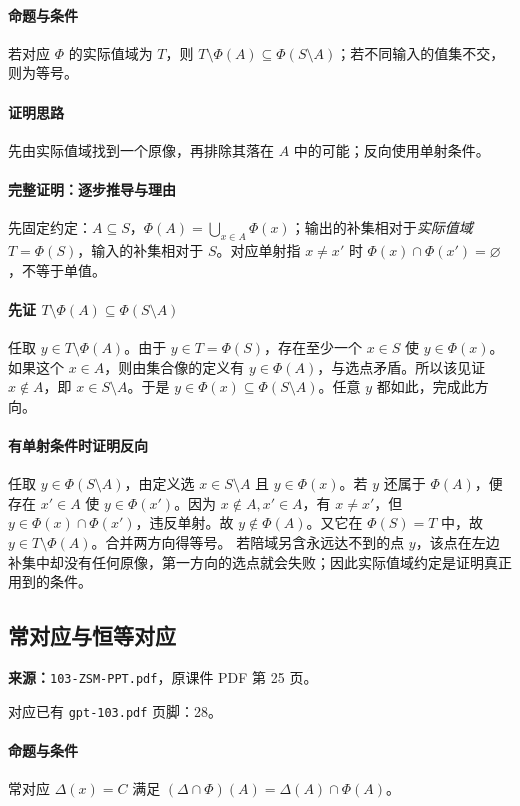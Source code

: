 \paragraph{命题与条件}若对应 $\Phi$ 的实际值域为 $T$，则 $T\setminus\Phi(A)\subseteq\Phi(S\setminus A)$；若不同输入的值集不交，则为等号。
\paragraph{证明思路}先由实际值域找到一个原像，再排除其落在 $A$ 中的可能；反向使用单射条件。
\paragraph{完整证明：逐步推导与理由}

先固定约定：$A\subseteq S$，$\Phi(A)=\bigcup_{x\in A}\Phi(x)$；输出的补集相对于\emph{实际值域} $T=\Phi(S)$，输入的补集相对于 $S$。对应单射指 $x\ne x'$ 时 $\Phi(x)\cap\Phi(x')=\varnothing$，不等于单值。
\paragraph{先证 $T\setminus\Phi(A)\subseteq\Phi(S\setminus A)$}
任取 $y\in T\setminus\Phi(A)$。由于 $y\in T=\Phi(S)$，存在至少一个 $x\in S$ 使 $y\in\Phi(x)$。如果这个 $x\in A$，则由集合像的定义有 $y\in\Phi(A)$，与选点矛盾。所以该见证 $x\notin A$，即 $x\in S\setminus A$。于是 $y\in\Phi(x)\subseteq\Phi(S\setminus A)$。任意 $y$ 都如此，完成此方向。
\paragraph{有单射条件时证明反向}
任取 $y\in\Phi(S\setminus A)$，由定义选 $x\in S\setminus A$ 且 $y\in\Phi(x)$。若 $y$ 还属于 $\Phi(A)$，便存在 $x'\in A$ 使 $y\in\Phi(x')$。因为 $x\notin A,x'\in A$，有 $x\ne x'$，但 $y\in\Phi(x)\cap\Phi(x')$，违反单射。故 $y\notin\Phi(A)$。又它在 $\Phi(S)=T$ 中，故 $y\in T\setminus\Phi(A)$。合并两方向得等号。
若陪域另含永远达不到的点 $y$，该点在左边补集中却没有任何原像，第一方向的选点就会失败；因此实际值域约定是证明真正用到的条件。

\clearpage\subsection{常对应与恒等对应}
\textbf{来源：}\texttt{103-ZSM-PPT.pdf}，原课件 PDF 第 25 页。\par
对应已有 \texttt{gpt-103.pdf} 页脚：28。\par
\paragraph{命题与条件}常对应 $\Delta(x)=C$ 满足 $(\Delta\cap\Phi)(A)=\Delta(A)\cap\Phi(A)$。
